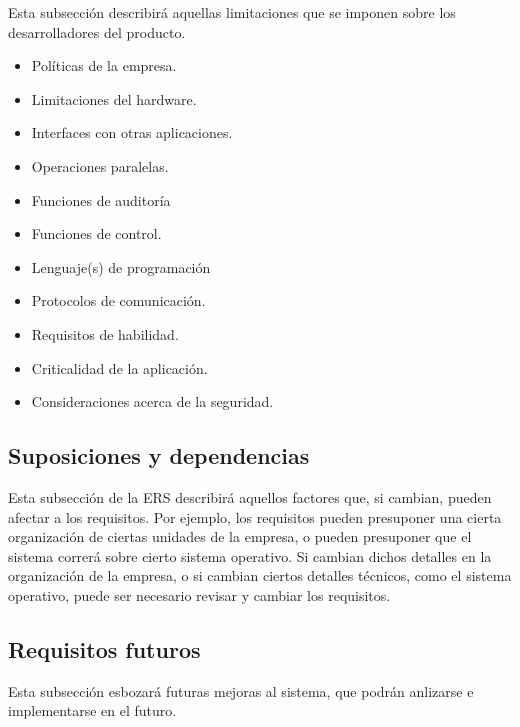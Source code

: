 \documentclass[12pt,a4paper, twosite]{book}
\begin{document}
Esta subsección describirá aquellas limitaciones que se imponen
sobre los desarrolladores del producto.

\begin{itemize}
\item Políticas de la empresa.

\item Limitaciones del hardware.

\item Interfaces con otras aplicaciones.

\item Operaciones paralelas.

\item Funciones de auditoría

\item Funciones de control.

\item Lenguaje(s) de programación

\item Protocolos de comunicación.

\item Requisitos de habilidad.

\item Criticalidad de la aplicación.

\item Consideraciones acerca de la seguridad.
\end{itemize}


\subsection{Suposiciones y dependencias}
\label{sec:org0ae23fe}

Esta subsección de la ERS describirá aquellos factores que, si
cambian, pueden afectar a los requisitos. Por ejemplo, los
requisitos pueden presuponer una cierta organización de ciertas
unidades de la empresa, o pueden presuponer que  el sistema correrá
sobre cierto sistema operativo. Si cambian dichos detalles en la
organización de la empresa, o si cambian ciertos detalles técnicos,
como el sistema operativo, puede ser necesario revisar y cambiar los
requisitos. 


\subsection{Requisitos futuros}
\label{sec:org33cfcdb}

Esta subsección esbozará futuras mejoras al sistema, que podrán
anlizarse e implementarse en el futuro.   
\end{document}
